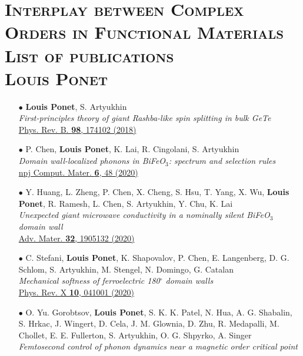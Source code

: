 \documentclass[10pt, a4paper]{article}
\begin{document}
\section*{\textsc{{\huge Interplay between Complex Orders in Functional Materials}\\[0.1cm] List of publications\\[0.2cm] {\normalsize Louis Ponet}}}

\hspace{2cm}

\begin{itemize}
	\item[$\bullet$]
	{\bf Louis Ponet}, S. Artyukhin\\
	{\it First-principles theory of giant Rashba-like spin splitting in bulk GeTe}\\
	\href{https://doi.org/10.1103/PhysRevB.98.174102}{Phys. Rev. B. {\bf 98}, 174102 (2018)}
	\item[$\bullet$]
	P. Chen, {\bf Louis Ponet}, K. Lai, R. Cingolani, S. Artyukhin\\
	{\it Domain wall-localized phonons in BiFeO$_3$: spectrum and selection rules}\\
	\href{https://doi.org/10.1038/s41524-020-0304-y}{npj Comput. Mater. {\bf 6}, 48 (2020)}
	\item[$\bullet$]
	Y. Huang, L. Zheng, P. Chen, X. Cheng, S. Hsu, T. Yang, X. Wu, {\bf Louis Ponet}, R. Ramesh, L. Chen, S. Artyukhin, Y. Chu, K. Lai\\
	{\it Unexpected giant microwave conductivity in a nominally silent BiFeO$_3$ domain wall}\\
	\href{https://doi.org/10.1002/adma.201905132}{Adv. Mater. {\bf 32}, 1905132 (2020)}
	\item[$\bullet$]
	C. Stefani, {\bf Louis Ponet}, K. Shapovalov, P. Chen, E. Langenberg, D. G. Schlom, S. Artyukhin, M. Stengel, N. Domingo, G. Catalan\\
	{\it Mechanical softness of ferroelectric 180$^\circ$ domain walls}\\ 
	\href{https://doi.org/10.1103/PhysRevX.10.041001}{Phys. Rev. X {\bf 10}, 041001 (2020)}
	\item[$\bullet$]
	O. Yu. Gorobtsov, {\bf Louis Ponet}, S. K. K. Patel, N. Hua, A. G. Shabalin, S. Hrkac, J. Wingert, D. Cela, J. M. Glownia, D. Zhu, R. Medapalli, M. Chollet, E. E. Fullerton, S. Artyukhin, O. G. Shpyrko, A. Singer\\
	{\it Femtosecond control of phonon dynamics near a magnetic order critical point}\\

\end{itemize}
\end{document}
